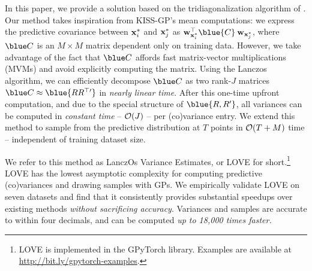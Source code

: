 In this paper, we provide a solution based on the tridiagonalization algorithm of \citet{lanczos1950iteration}.
Our method takes inspiration from KISS-GP's mean computations: we express the predictive covariance between $\mathbf{x}^*_i$ and $\mathbf{x}^{*}_j$ as
$\bw_{\bxtest_i}^\top \blue{\bC} \: \bw_{\bxtest_j}$,
where $\blue C$ is an $M \times M$ matrix dependent only on training data.
However, we take advantage of the fact that $\blue \bC$ affords fast matrix-vector multiplications (MVMs) and avoid explicitly computing the matrix.
Using the Lanczos algorithm, we can efficiently decompose $\blue \bC$ as two rank-$J$ matrices $\blue \bC \approx \blue{\bR \bR^{\top \prime}}$ in \emph{nearly linear time}.
After this one-time upfront computation, and due to the special structure of $\blue {\bR,\bR^\prime}$, all variances can be computed in \emph{constant time} -- $\bigo{J}$ -- per (co)variance entry.
We extend this method to sample from the predictive distribution at $T$ points in $\bigo{T + M}$ time -- independent of training dataset size.

We refer to this method as LanczOs Variance Estimates, or LOVE{} for short.\footnote{
  LOVE{} is implemented in the GPyTorch library.
  Examples are available at \url{http://bit.ly/gpytorch-examples}.
}
LOVE{} has the lowest asymptotic complexity for computing predictive (co)variances and drawing samples with GPs.
We empirically validate LOVE{} on seven datasets and find that it consistently provides substantial speedups over existing methods \emph{without sacrificing accuracy}.
Variances and samples are accurate to within four decimals, and can be computed \emph{up to 18,000 times faster.}
